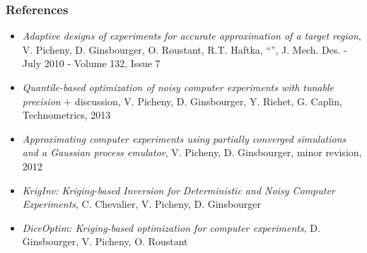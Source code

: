 \documentclass[10pt]{beamer}
\begin{document}
\frame
{
\frametitle{References}

\footnotesize
\begin{itemize}
 \item \textit{Adaptive designs of experiments for accurate approximation of a target region}, V. Picheny, D. Ginsbourger, O. Roustant, R.T. Haftka, “”, J. Mech. Des. - July 2010 - Volume 132, Issue 7
 \item \textit{Quantile-based optimization of noisy computer experiments with tunable precision} + discussion, V. Picheny, D. Ginsbourger, Y. Richet, G. Caplin, Technometrics, 2013
 \item \textit{Approximating computer experiments using partially converged simulations and a Gaussian process emulator}, V. Picheny, D. Ginsbourger, minor revision, 2012
 \item \textit{KrigInv: Kriging-based Inversion for Deterministic and Noisy Computer Experiments}, C. Chevalier, V. Picheny, D. Ginsbourger
 \item \textit{DiceOptim: Kriging-based optimization for computer experiments}, D. Ginsbourger, V. Picheny, O. Roustant
\end{itemize}
}
\end{document}
